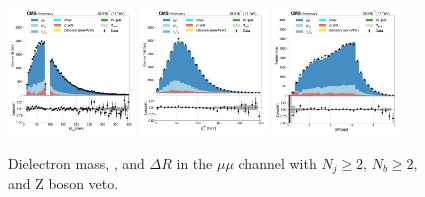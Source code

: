 \begin{figure}[htb!]
    \centering
    \includegraphics[width=0.3\textwidth]{chapters/Analysis/sectionPlots/figures/data_mc_overlays/mumu_2016_cat_gt2_gt2_b_signal_linear_lepton_dilepton1_mass}
    \includegraphics[width=0.3\textwidth]{chapters/Analysis/sectionPlots/figures/data_mc_overlays/mumu_2016_cat_gt2_gt2_b_signal_linear_lepton_dilepton1_pt}
    \includegraphics[width=0.3\textwidth]{chapters/Analysis/sectionPlots/figures/data_mc_overlays/mumu_2016_cat_gt2_gt2_b_signal_linear_lepton_dilepton1_delta_r}
    \caption{Dielectron mass, \pt, and $\Delta R$ in the $\mu\mu$ channel
    with $N_{j} \geq 2$, $N_{b} \geq 2$, and Z boson veto.}
    \label{fig:analysis:plots:mumu_2_dilepton}
\end{figure}

